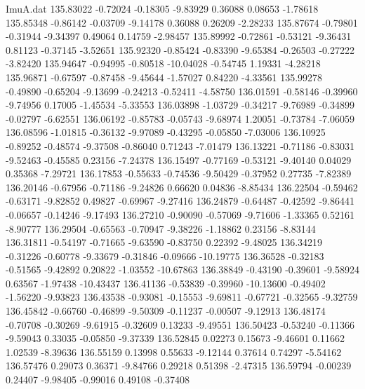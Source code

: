 \begin{filecontents}{ImuA.dat}
 135.83022   -0.72024   -0.18305   -9.83929    0.36088    0.08653   -1.78618
 135.85348   -0.86142   -0.03709   -9.14178    0.36088    0.26209   -2.28233
 135.87674   -0.79801   -0.31944   -9.34397    0.49064    0.14759   -2.98457
 135.89992   -0.72861   -0.53121   -9.36431    0.81123   -0.37145   -3.52651
 135.92320   -0.85424   -0.83390   -9.65384   -0.26503   -0.27222   -3.82420
 135.94647   -0.94995   -0.80518  -10.04028   -0.54745    1.19331   -4.28218
 135.96871   -0.67597   -0.87458   -9.45644   -1.57027    0.84220   -4.33561
 135.99278   -0.49890   -0.65204   -9.13699   -0.24213   -0.52411   -4.58750
 136.01591   -0.58146   -0.39960   -9.74956    0.17005   -1.45534   -5.33553
 136.03898   -1.03729   -0.34217   -9.76989   -0.34899   -0.02797   -6.62551
 136.06192   -0.85783   -0.05743   -9.68974    1.20051   -0.73784   -7.06059
 136.08596   -1.01815   -0.36132   -9.97089   -0.43295   -0.05850   -7.03006
 136.10925   -0.89252   -0.48574   -9.37508   -0.86040    0.71243   -7.01479
 136.13221   -0.71186   -0.83031   -9.52463   -0.45585    0.23156   -7.24378
 136.15497   -0.77169   -0.53121   -9.40140    0.04029    0.35368   -7.29721
 136.17853   -0.55633   -0.74536   -9.50429   -0.37952    0.27735   -7.82389
 136.20146   -0.67956   -0.71186   -9.24826    0.66620    0.04836   -8.85434
 136.22504   -0.59462   -0.63171   -9.82852    0.49827   -0.69967   -9.27416
 136.24879   -0.64487   -0.42592   -9.86441   -0.06657   -0.14246   -9.17493
 136.27210   -0.90090   -0.57069   -9.71606   -1.33365    0.52161   -8.90777
 136.29504   -0.65563   -0.70947   -9.38226   -1.18862    0.23156   -8.83144
 136.31811   -0.54197   -0.71665   -9.63590   -0.83750    0.22392   -9.48025
 136.34219   -0.31226   -0.60778   -9.33679   -0.31846   -0.09666  -10.19775
 136.36528   -0.32183   -0.51565   -9.42892    0.20822   -1.03552  -10.67863
 136.38849   -0.43190   -0.39601   -9.58924    0.63567   -1.97438  -10.43437
 136.41136   -0.53839   -0.39960  -10.13600   -0.49402   -1.56220   -9.93823
 136.43538   -0.93081   -0.15553   -9.69811   -0.67721   -0.32565   -9.32759
 136.45842   -0.66760   -0.46899   -9.50309   -0.11237   -0.00507   -9.12913
 136.48174   -0.70708   -0.30269   -9.61915   -0.32609    0.13233   -9.49551
 136.50423   -0.53240   -0.11366   -9.59043    0.33035   -0.05850   -9.37339
 136.52845    0.02273    0.15673   -9.46601    0.11662    1.02539   -8.39636
 136.55159    0.13998    0.55633   -9.12144    0.37614    0.74297   -5.54162
 136.57476    0.29073    0.36371   -9.84766    0.29218    0.51398   -2.47315
 136.59794   -0.00239    0.24407   -9.98405   -0.99016    0.49108   -0.37408

\end{filecontents}
